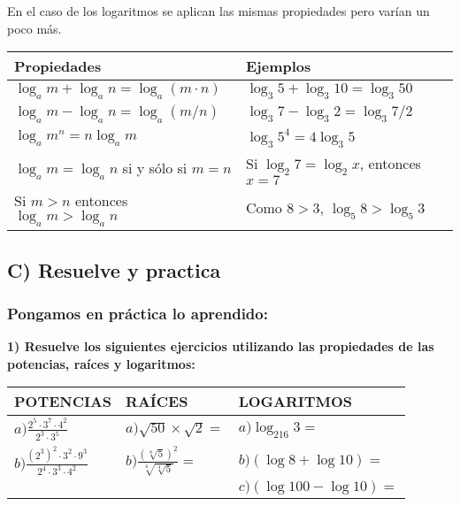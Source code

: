 \documentclass[12pt,a4paper]{article}
\begin{document}
\begin{tcolorbox}[colback=fondoazul,colframe=azuloscuro,title=\textbf{Propiedades de los logaritmos},fonttitle=\bfseries,breakable]

En el caso de los logaritmos se aplican las mismas propiedades pero varían un poco más.

\vspace{0.5cm}

\begin{center}
\begin{tabular}{|l|l|}
\hline
\cellcolor{fondoverde}\textbf{Propiedades} & \textbf{Ejemplos} \\
\hline
$\log_a m + \log_a n = \log_a (m \cdot n)$ & $\log_3 5 + \log_3 10 = \log_3 50$ \\
\hline
$\log_a m - \log_a n = \log_a (m/n)$ & $\log_3 7 - \log_3 2 = \log_3 7/2$ \\
\hline
$\log_a m^n = n \log_a m$ & $\log_3 5^4 = 4 \log_3 5$ \\
\hline
$\log_a m = \log_a n$ si y sólo si $m=n$ & Si $\log_2 7 = \log_2 x$, entonces $x=7$ \\
\hline
Si $m > n$ entonces $\log_a m > \log_a n$ & Como $8 > 3$, $\log_5 8 > \log_5 3$ \\
\hline
\end{tabular}
\end{center}

\end{tcolorbox}


\subsection*{C) Resuelve y practica}

\subsubsection*{Pongamos en práctica lo aprendido:}

\textbf{1) Resuelve los siguientes ejercicios utilizando las propiedades de las potencias, raíces y logaritmos:}

\vspace{0.5cm}

\begin{center}
\begin{tabular}{|p{}|p{}|p{}|}
\hline
\cellcolor{fondoazul}\textbf{POTENCIAS} & \cellcolor{fondoazul}\textbf{RAÍCES} & \cellcolor{fondoazul}\textbf{LOGARITMOS} \\
\hline
$a) \frac{2^5 \cdot 3^7 \cdot 4^2}{2^3 \cdot 3^5}$ & $a) \sqrt{50} \times \sqrt{2} =$ & $a) \log_{216} 3 =$ \\[0.5cm]
\hline
$b) \frac{(2^3)^2 \cdot 3^2 \cdot 9^3}{2^4 \cdot 3^3 \cdot 4^2}$ & $b) \frac{(\sqrt[8]{5})^2}{\sqrt[4]{\sqrt[4]{5}}} =$ & $b) (\log 8 + \log 10) =$ \\[0.5cm]
& & $c) (\log 100 - \log 10) =$ \\[0.5cm]
\hline
\end{tabular}
\end{center}
\end{document}
